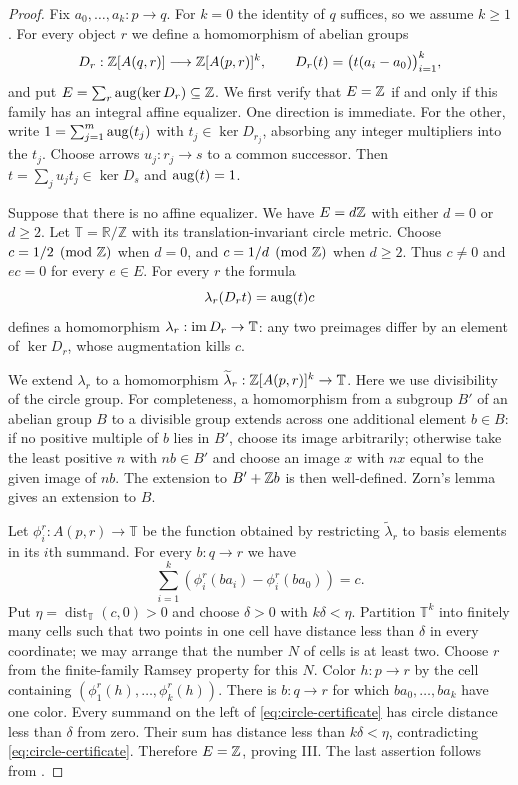 \begin{proof}
Fix $a_0,\ldots,a_k:p\to q$. For $k=0$ the identity of $q$ suffices,
so we assume $k\geq1$. For every object $r$ we define a homomorphism
of abelian groups
\[
D_r:\mathbb Z[A(q,r)]\longrightarrow\mathbb Z[A(p,r)]^k,
\qquad D_r(t)=\bigl(t(a_i-a_0)\bigr)_{i=1}^k,
\]
and put $E=\sum_r\operatorname{aug}(\ker D_r)\subseteq\mathbb Z$.
We first verify that $E=\mathbb Z$ if and only if this family has an integral
affine equalizer. One direction is immediate. For the other, write
$1=\sum_{j=1}^m\operatorname{aug}(t_j)$ with $t_j\in\ker D_{r_j}$, absorbing any
integer multipliers into the $t_j$. Choose arrows $u_j:r_j\to s$ to a
common successor. Then $t=\sum_j u_jt_j\in\ker D_s$ and $\operatorname{aug}(t)=1$.

Suppose that there is no affine equalizer. We have $E=d\mathbb Z$ with either
$d=0$ or $d\geq2$. Let $\mathbb T=\mathbb R/\mathbb Z$ with its
translation-invariant circle metric. Choose $c=1/2\pmod{\mathbb Z}$ when $d=0$,
and $c=1/d\pmod{\mathbb Z}$ when $d\geq2$. Thus $c\ne0$ and $ec=0$ for
every $e\in E$. For every $r$ the formula
\[
\lambda_r(D_rt)=\operatorname{aug}(t)c
\]
defines a homomorphism $\lambda_r:\operatorname{im} D_r\to\mathbb T$: any two
preimages differ by an element of $\ker D_r$, whose augmentation kills
$c$.

We extend $\lambda_r$ to a homomorphism
$\widetilde\lambda_r:\mathbb Z[A(p,r)]^k\to\mathbb T$.
Here we use divisibility of the circle group. For completeness, a
homomorphism from a subgroup $B'$ of an abelian group $B$ to a divisible
group extends across one additional element $b\in B$: if no positive
multiple of $b$ lies in $B'$, choose its image arbitrarily; otherwise take
the least positive $n$ with $nb\in B'$ and choose an image $x$ with
$nx$ equal to the given image of $nb$. The extension to $B'+\mathbb Z b$ is
then well-defined. Zorn's lemma gives an extension to $B$.

Let $\phi_i^r:A(p,r)\to\mathbb T$ be the function obtained by restricting
$\widetilde\lambda_r$ to basis elements in its $i$th summand. For every
$b:q\to r$ we have
\begin{equation}\label{eq:circle-certificate}
\sum_{i=1}^k\left(\phi_i^r(ba_i)-\phi_i^r(ba_0)\right)=c.
\end{equation}
Put $\eta=\operatorname{dist}_{\mathbb T}(c,0)>0$ and choose
$\delta>0$ with $k\delta<\eta$. Partition $\mathbb T^k$ into finitely
many cells such that two points in one cell have distance less than
$\delta$ in every coordinate; we may arrange that the number $N$ of
cells is at least two. Choose $r$ from the finite-family Ramsey property
for this $N$. Color $h:p\to r$ by the cell containing
$(\phi_1^r(h),\ldots,\phi_k^r(h))$. There is $b:q\to r$ for which
$ba_0,\ldots,ba_k$ have one color. Every summand on the left of
\eqref{eq:circle-certificate} has circle distance less than $\delta$
from zero. Their sum has distance less than $k\delta<\eta$, contradicting
\eqref{eq:circle-certificate}. Therefore $E=\mathbb Z$, proving III.
The last assertion follows from \citet[Proposition~3.3]{IsbellMitchell1976}.
\end{proof}

